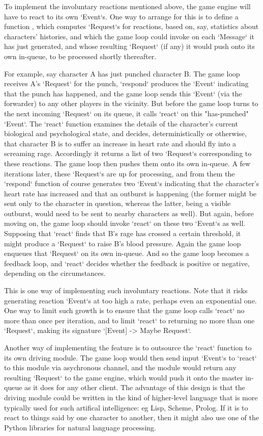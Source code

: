 To implement the involuntary reactions mentioned above, the game engine will
have to react to its own `Event`s.
One way to arrange for this is to define a
function , which computes `Request`s for
reactions, based on, say, statistics about characters' histories, and which
the game loop could invoke on each `Message` it has just generated, and whose
resulting `Request` (if any) it would push onto its own in-queue, to be
processed shortly thereafter.

For example, say character A has just punched character B\@.
The game loop receives A's `Request` for the punch, `respond` produces
the `Event` indicating that the punch has happened, and the
game loop sends this `Event` (via the forwarder) to any other players
in the vicinity.
But before the game loop turns to the next incoming `Request`
on its queue, it calls `react` on this "has-punched" `Event`.
The `react`
function examines the details of the character's current biological and
psychological state, and decides, deterministically or otherwise, that
character B is to suffer an increase in heart rate and should fly into a
screaming rage.
Accordingly it returns a list of two `Request`s corresponding to these
reactions.
The game loop then pushes them onto its own in-queue.
A few iterations later, these `Request`s are up for processing, and from them
the `respond` function of course generates two `Event`s indicating that the
character's heart rate has increased and that an outburst is happening (the
former might be sent only to the character in question, whereas the latter,
being a visible outburst, would need to be sent to nearby characters as well).
But again, before moving on, the game loop should invoke `react` on these two
`Event`s as well.
Supposing that `react` finds that B's rage has
crossed a certain threshold, it might produce a `Request` to raise B's blood
pressure.
Again the game loop enqueues that `Request` on its
own in-queue.
And so the game loop becomes a feedback loop, and `react` decides
whether the feedback is positive or negative, depending on the circumstances.

This is one way of implementing such involuntary reactions.
Note that it risks generating reaction `Event`s at too high a rate, perhaps
even an exponential one.
One way to limit such growth is to ensure that the game loop calls `react`
no more than once per iteration, and to limit `react` to returning no more than
one `Request`, making its signature `[Event] -> Maybe Request`.

Another way of implementing the feature is to outsource the `react` function
to its own driving module.
The game loop would then send input `Event`s to
`react` to this module via asychronous channel, and the module would return any
resulting `Request` to the game engine, which would push it onto the master
in-queue as it does for any other client.
The advantage of this design is that
the driving module could be written in the kind of higher-level language that
is more typically used for such artifical intelligence: eg Lisp, Scheme,
Prolog.
If it is to react to things said by one character to another, then it
might also use one of the Python libraries for natural language processing.

